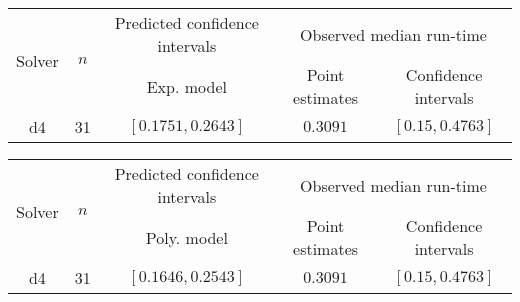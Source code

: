\begin{tabular}{ccccc}
\hline 
\multirow{2}{*}{Solver} & \multirow{2}{*}{$n$} & Predicted confidence intervals & \multicolumn{2}{c}{Observed median  run-time}\tabularnewline
 &  & Exp. model  & Point estimates  & Confidence intervals\tabularnewline
\hline 
\hline 
\multirow{0}{*}{d4} & 31 & $\mathbf{\left[0.1751,0.2643\right]}$ & $0.3091$ & $\left[0.15,0.4763\right]$ \tabularnewline 
\hline 
\end{tabular} 

\begin{tabular}{ccccc}
\hline 
\multirow{2}{*}{Solver} & \multirow{2}{*}{$n$} & Predicted confidence intervals & \multicolumn{2}{c}{Observed median  run-time}\tabularnewline
 &  & Poly. model  & Point estimates  & Confidence intervals\tabularnewline
\hline 
\hline 
\multirow{0}{*}{d4} & 31 & $\mathbf{\left[0.1646,0.2543\right]}$ & $0.3091$ & $\left[0.15,0.4763\right]$ \tabularnewline 
\hline 
\end{tabular} 


